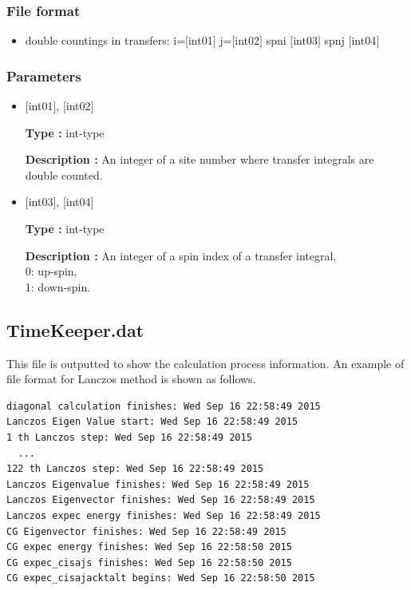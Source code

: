 \subsubsection{File format}
 \begin{itemize}
   \item  double countings in transfers: i=$[$int01$]$ j=$[$int02$]$ spni $[$int03$]$  spnj $[$int04$]$   
 \end{itemize}
 
\subsubsection{Parameters}
 \begin{itemize}

    \item  $[$int01$]$, $[$int02$]$
   
    {\bf Type :} int-type

   {\bf Description :} An integer of a site number where transfer integrals are double counted.
      
         \item  $[$int03$]$, $[$int04$]$  
   
    {\bf Type :} int-type

   {\bf Description :} An integer of a spin index of a transfer integral, \\
   0: up-spin,\\
   1: down-spin.\\ 
\end{itemize}

\newpage
\subsection{TimeKeeper.dat}
This file is outputted to show the calculation process information.
An example of file format for Lanczos method is shown as follows.

\begin{minipage}{12.5cm}
\begin{screen}
\begin{verbatim}
diagonal calculation finishes: Wed Sep 16 22:58:49 2015
Lanczos Eigen Value start: Wed Sep 16 22:58:49 2015
1 th Lanczos step: Wed Sep 16 22:58:49 2015
  ...
122 th Lanczos step: Wed Sep 16 22:58:49 2015
Lanczos Eigenvalue finishes: Wed Sep 16 22:58:49 2015
Lanczos Eigenvector finishes: Wed Sep 16 22:58:49 2015
Lanczos expec energy finishes: Wed Sep 16 22:58:49 2015
CG Eigenvector finishes: Wed Sep 16 22:58:49 2015
CG expec energy finishes: Wed Sep 16 22:58:50 2015
CG expec_cisajs finishes: Wed Sep 16 22:58:50 2015
CG expec_cisajacktalt begins: Wed Sep 16 22:58:50 2015
\end{verbatim}
\end{screen}
\end{minipage}

